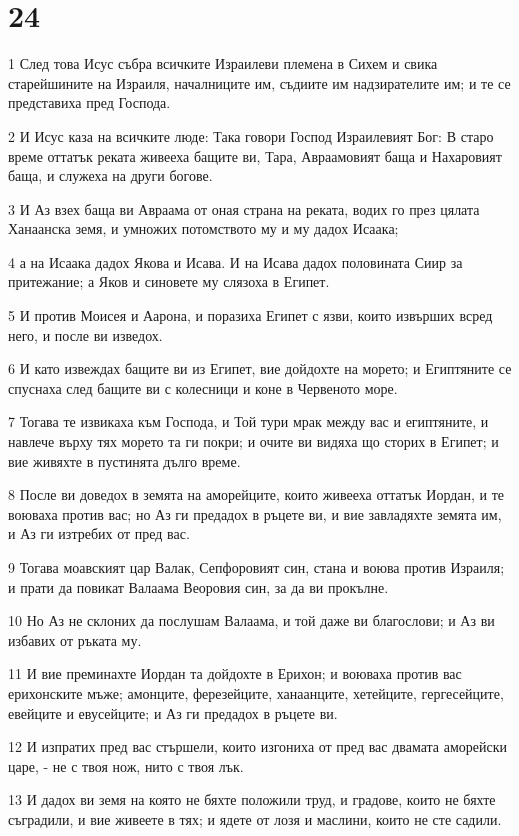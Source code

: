 \chapter{24}

\par 1 След това Исус събра всичките Израилеви племена в Сихем и свика старейшините на Израиля, началниците им, съдиите им надзирателите им; и те се представиха пред Господа.
\par 2 И Исус каза на всичките люде: Така говори Господ Израилевият Бог: В старо време оттатък реката живееха бащите ви, Тара, Авраамовият баща и Нахаровият баща, и служеха на други богове.
\par 3 И Аз взех баща ви Авраама от оная страна на реката, водих го през цялата Ханаанска земя, и умножих потомството му и му дадох Исаака;
\par 4 а на Исаака дадох Якова и Исава. И на Исава дадох половината Сиир за притежание; а Яков и синовете му слязоха в Египет.
\par 5 И против Моисея и Аарона, и поразиха Египет с язви, които извърших всред него, и после ви изведох.
\par 6 И като извеждах бащите ви из Египет, вие дойдохте на морето; и Египтяните се спуснаха след бащите ви с колесници и коне в Червеното море.
\par 7 Тогава те извикаха към Господа, и Той тури мрак между вас и египтяните, и навлече върху тях морето та ги покри; и очите ви видяха що сторих в Египет; и вие живяхте в пустинята дълго време.
\par 8 После ви доведох в земята на аморейците, които живееха оттатък Иордан, и те воюваха против вас; но Аз ги предадох в ръцете ви, и вие завладяхте земята им, и Аз ги изтребих от пред вас.
\par 9 Тогава моавският цар Валак, Сепфоровият син, стана и воюва против Израиля; и прати да повикат Валаама Веоровия син, за да ви прокълне.
\par 10 Но Аз не склоних да послушам Валаама, и той даже ви благослови; и Аз ви избавих от ръката му.
\par 11 И вие преминахте Иордан та дойдохте в Ерихон; и воюваха против вас ерихонските мъже; амонците, ферезейците, ханаанците, хетейците, гергесейците, евейците и евусейците; и Аз ги предадох в ръцете ви.
\par 12 И изпратих пред вас стършели, които изгониха от пред вас двамата аморейски царе, - не с твоя нож, нито с твоя лък.
\par 13 И дадох ви земя на която не бяхте положили труд, и градове, които не бяхте съградили, и вие живеете в тях; и ядете от лозя и маслини, които не сте садили.
